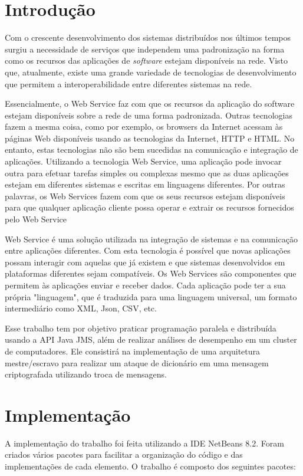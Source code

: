 \documentclass[
	12pt,				%
    oneside,			%
	a4paper,			%
	english,			%
	brazil,				%
	]{abntex2}
\begin{document}
\chapter{Introdução} 

Com o crescente desenvolvimento dos sistemas distribuídos nos últimos tempos surgiu a necessidade de serviços que independem uma padronização na forma como os recursos das aplicações de \textit{software} estejam disponíveis na rede. Visto que, atualmente, existe uma grande variedade de tecnologias de desenvolvimento que permitem a interoperabilidade entre diferentes sistemas na rede.

Essencialmente, o Web Service faz com que os recursos da aplicação do 
software estejam disponíveis sobre a rede de uma forma padronizada. Outras 
tecnologias fazem a mesma coisa, como por exemplo, os browsers da Internet 
acessam às páginas Web disponíveis usando as tecnologias da Internet, HTTP 
e HTML. No entanto, estas tecnologias não são bem sucedidas na 
comunicação e integração de aplicações. Utilizando a tecnologia Web Service, 
uma aplicação pode invocar outra para efetuar tarefas simples ou complexas 
mesmo que as duas aplicações estejam em diferentes sistemas e escritas em 
linguagens diferentes. Por outras palavras, os Web Services fazem com que os 
seus recursos estejam disponíveis para que qualquer aplicação cliente possa 
operar e extrair os recursos fornecidos pelo Web Service

Web Service é uma solução utilizada na integração de sistemas e na comunicação entre aplicações diferentes. Com esta tecnologia é possível que novas aplicações possam interagir com aquelas que já existem e que sistemas desenvolvidos em plataformas diferentes sejam compatíveis. Os Web Services são componentes que permitem às aplicações enviar e receber dados. Cada aplicação pode ter a sua própria "linguagem", que é traduzida para uma linguagem universal, um formato intermediário como XML, Json, CSV, etc.

Esse trabalho tem por objetivo praticar programação paralela e distribuída usando a API Java JMS, além de 
realizar análises de desempenho em um cluster de computadores. Ele consistirá na implementação de uma arquitetura mestre/escravo para realizar um ataque de dicionário em uma mensagem criptografada utilizando troca de mensagens.


\chapter{Implementação} 
A implementação do trabalho foi feita utilizando a IDE NetBeans 8.2. Foram criados vários pacotes para facilitar a organização 
do código e das implementações de cada elemento. O trabalho é composto dos seguintes pacotes:
\end{document}
